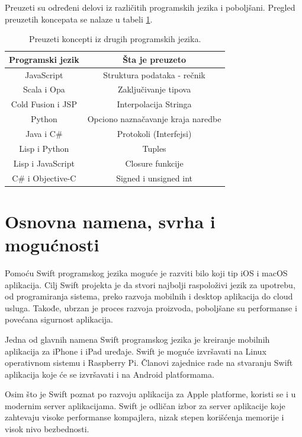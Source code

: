 \documentclass[a4paper]{article}
\begin{document}
 Preuzeti su određeni delovi iz različitih programskih jezika i poboljšani. Pregled preuzetih koncepata se nalaze u tabeli \ref{tab:tabela2}.

\begin{table}[h!]
\begin{center}
\caption{Preuzeti koncepti iz drugih programskih jezika.}
\begin{tabular}{|c|c|} \hline
\label{tab:tabela2}
Programski jezik & Šta je preuzeto \\ \hline
JavaScript & Struktura podataka - rečnik  \\ \hline
Scala i Opa & Zaključivanje tipova \\ \hline
Cold Fusion i JSP & Interpolacija Stringa \\ \hline
Python & Opciono naznačavanje kraja naredbe \\ \hline
Java i C\# & Protokoli (Interfejsi) \\ \hline
Lisp i Python & Tuples \\ \hline
Lisp i JavaScript &  Closure funkcije \\ \hline
C\# i Objective-C & Signed i unsigned int \\ \hline
\end{tabular}
\end{center}
\end{table}



\section{Osnovna namena, svrha i mogućnosti}	
\label{sec:drugiDeo}


Pomoću Swift programskog jezika moguće je razviti bilo koji tip iOS i macOS aplikacija. Cilj Swift projekta je da stvori najbolji raspoloživi jezik za upotrebu, od programiranja sistema, preko razvoja mobilnih i desktop aplikacija do cloud usluga. Takođe, ubrzan je proces razvoja proizvoda, poboljšane su performanse i povećana sigurnost aplikacija.

Jedna od glavnih namena Swift programskog jezika je kreiranje mobilnih aplikacija za iPhone i iPad uređaje. Swift je moguće izvršavati na Linux operativnom sistemu i Raspberry Pi. Članovi zajednice rade na stvaranju Swift aplikacija koje će se izvršavati i na Android platformama.

Osim što je Swift poznat po razvoju aplikacija za Apple platforme, koristi se i u modernim server aplikacijama. Swift je odličan izbor za server aplikacije koje zahtevaju visoke performanse kompajlera, nizak stepen korišćenja memorije i visok nivo bezbednosti.
\end{document}

